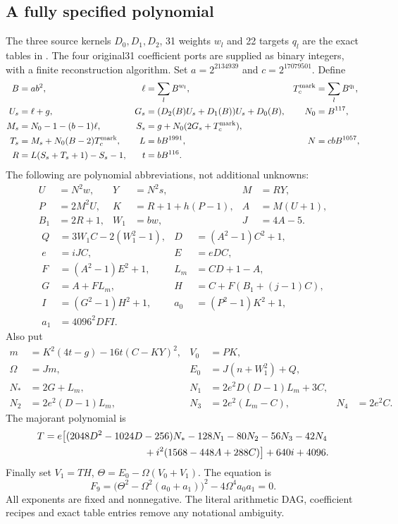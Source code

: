 \subsection{A fully specified polynomial}
The three source kernels $D_0,D_1,D_2$, 31 weights $w_l$ and 22 targets $q_l$
are the exact tables in . The four original31
coefficient ports are supplied as binary integers, with a finite reconstruction
algorithm. Set $a=2^{2134939}$ and $c=2^{17079501}$. Define
\begin{align*}
 B&=ab^2,& \ell&=\sum_l B^{w_l},& T_c^{\rm mark}&=\sum_l B^{q_l},\\
 U_s&=\ell+g,& G_s&=(D_2(B)U_s+D_1(B))U_s+D_0(B),& N_0&=B^{117},\\
 M_s&=N_0-1-(b-1)\ell,&
 S_s&=g+N_0(2G_s+T_c^{\rm mark}),&&\\
 T_s&=M_s+N_0(B-2)T_c^{\rm mark},&
 L&=bB^{1991},&N&=cbB^{1057},\\
 R&=L(S_s+T_s+1)-S_s-1,&t&=bB^{116}.&&
\end{align*}
The following are polynomial abbreviations, not additional unknowns:
\begin{align*}
 U&=N^2w,&Y&=N^2s,&M&=RY,\\
 P&=2M^2U,&K&=R+1+h(P-1),&A&=M(U+1),\\
 B_1&=2R+1,&W_1&=bw,&J&=4A-5.
\end{align*}
\begin{align*}
 Q&=3W_1C-2(W_1^2-1),&D&=(A^2-1)C^2+1,\\
 e&=iJC,&E&=eDC,\\
 F&=(A^2-1)E^2+1,&L_m&=CD+1-A,\\
 G&=A+FL_m,&H&=C+F(B_1+(j-1)C),\\
 I&=(G^2-1)H^2+1,&a_0&=(P^2-1)K^2+1,\\
 a_1&=4096^2DFI.&&
\end{align*}
Also put
\begin{align*}
 m&=K^2(4t-g)-16t(C-KY)^2,&V_0&=PK,\\
 \Omega&=Jm,& E_0&=J(n+W_1^2)+Q,\\
 N_*&=2G+L_m,&N_1&=2e^2D(D-1)L_m+3C,\\
 N_2&=2e^2(D-1)L_m,&N_3&=2e^2(L_m-C),&N_4&=2e^2C.
\end{align*}
The majorant polynomial is
\begin{align*}
 T={}&e\bigl[(2048D^2-1024D-256)N_*-128N_1-80N_2-56N_3-42N_4\\
 &\hspace{31mm}+i^2(1568-448A+288C)\bigr]+640i+4096.
\end{align*}
Finally set $V_1=TH$, $\Theta=E_0-\Omega(V_0+V_1)$. The equation is
\begin{equation}\label{eq:nine-composed}
 \boxed{F_9=\bigl(\Theta^2-\Omega^2(a_0+a_1)\bigr)^2
                      -4\Omega^4a_0a_1=0.}
\end{equation}
All exponents are fixed and nonnegative. The literal arithmetic DAG,
coefficient recipes and exact table entries remove any notational ambiguity.

